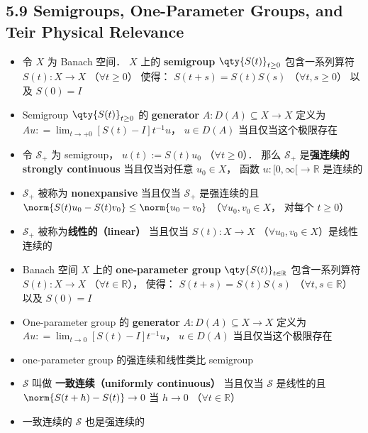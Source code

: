 \subsection{5.9 Semigroups, One-Parameter Groups, and Teir Physical Relevance}
\begin{itemize}
\item 令 $X$ 为 Banach 空间． $X$ 上的 \textbf{semigroup} $\qty{S(t)}_{t\ge0}$ 包含一系列算符 $S(t):X\to X$ （$\forall t\ge0$） 使得： $S(t+s) = S(t)S(s)$ （$\forall t, s\ge 0$） 以及 $S(0) = I$

\item Semigroup $\qty{S(t)}_{t\ge0}$ 的 \textbf{generator} $A:D(A) \subseteq X\to X$ 定义为 $Au: = \lim_{t\to+0} [S(t)-I]t^{-1} u$， $u\in D(A)$ 当且仅当这个极限存在

\item 令 $\mathcal S_+$ 为 semigroup， $u(t) := S(t)u_0$ （$\forall t \ge 0$）． 那么 $\mathcal S_+$ 是\textbf{强连续的\textbf{strongly continuous}} 当且仅当对任意 $u_0\in X$， 函数 $u:[0,\infty[ \to\mathbb R$ 是连续的

\item $\mathcal S_+$ 被称为 \textbf{nonexpansive} 当且仅当 $\mathcal S_+$ 是强连续的且 $\norm{S(t)u_0 - S(t)v_0} \le \norm{u_0 - v_0}$ （$\forall u_0, v_0 \in X$， 对每个 $t\ge0$）

\item $\mathcal S_+$ 被称为\textbf{线性的（linear）} 当且仅当 $S(t): X\to X$ （$\forall u_0, v_0\in X$）是线性连续的

\item Banach 空间 $X$ 上的 \textbf{one-parameter group} $\qty{S(t)}_{t\in\mathbb R}$ 包含一系列算符 $S(t):X\to X$ （$\forall t\in\mathbb R$）， 使得： $S(t+s) = S(t)S(s)$ （$\forall t, s\in \mathbb R$） 以及 $S(0) = I$

\item One-parameter group 的 \textbf{generator} $A:D(A) \subseteq X\to X$ 定义为 $Au: = \lim_{t\to0} [S(t)-I]t^{-1} u$， $u\in D(A)$ 当且仅当这个极限存在

\item one-parameter group 的强连续和线性类比 semigroup

\item $\mathcal S$ 叫做 \textbf{一致连续（uniformly continuous）} 当且仅当 $\mathcal S$ 是线性的且 $\norm{S(t+h)-S(t)}\to0$ 当 $h\to0$ （$\forall t\in\mathbb R$）

\item 一致连续的 $\mathcal S$ 也是强连续的


\end{itemize}
